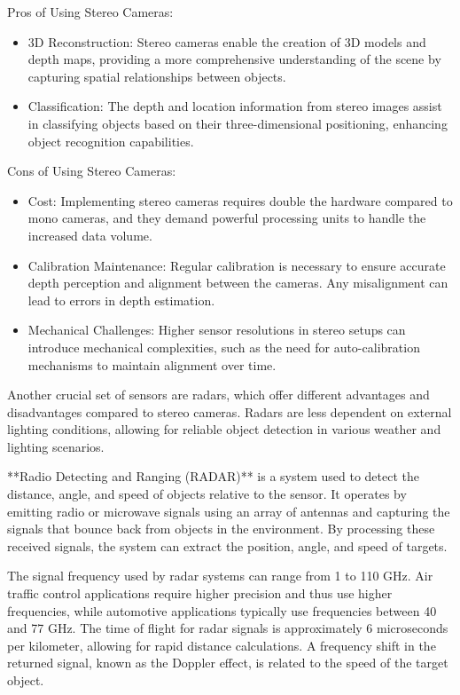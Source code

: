 Pros of Using Stereo Cameras:
\begin{itemize}
    \item 3D Reconstruction: Stereo cameras enable the creation of 3D models and depth maps, providing a more comprehensive understanding of the scene by capturing spatial relationships between objects.
    \item Classification: The depth and location information from stereo images assist in classifying objects based on their three-dimensional positioning, enhancing object recognition capabilities.
\end{itemize}

Cons of Using Stereo Cameras:
\begin{itemize}
    \item Cost: Implementing stereo cameras requires double the hardware compared to mono cameras, and they demand powerful processing units to handle the increased data volume.
    \item Calibration Maintenance: Regular calibration is necessary to ensure accurate depth perception and alignment between the cameras. Any misalignment can lead to errors in depth estimation.
    \item Mechanical Challenges: Higher sensor resolutions in stereo setups can introduce mechanical complexities, such as the need for auto-calibration mechanisms to maintain alignment over time.
\end{itemize}

Another crucial set of sensors are radars, which offer different advantages and disadvantages compared to stereo cameras. Radars are less dependent on external lighting conditions, allowing for reliable object detection in various weather and lighting scenarios.

**Radio Detecting and Ranging (RADAR)** is a system used to detect the distance, angle, and speed of objects relative to the sensor. It operates by emitting radio or microwave signals using an array of antennas and capturing the signals that bounce back from objects in the environment. By processing these received signals, the system can extract the position, angle, and speed of targets.

The signal frequency used by radar systems can range from 1 to 110 GHz. Air traffic control applications require higher precision and thus use higher frequencies, while automotive applications typically use frequencies between 40 and 77 GHz. The time of flight for radar signals is approximately 6 microseconds per kilometer, allowing for rapid distance calculations. A frequency shift in the returned signal, known as the Doppler effect, is related to the speed of the target object.

